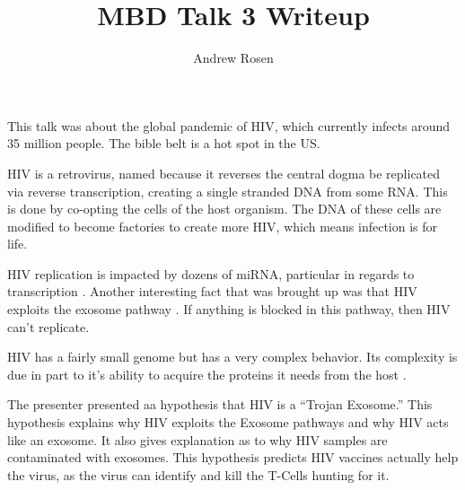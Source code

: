 \documentclass[10pt,letterpaper]{article}
\author{Andrew Rosen}
\title{MBD Talk 3 Writeup}
\begin{document}
	\maketitle
	This talk was about the global pandemic of HIV, which currently infects around 35 million people.
	The bible belt is a hot spot in the US.
	
	HIV is a retrovirus, named because it reverses the central dogma be replicated via reverse transcription, creating a single stranded DNA from some RNA.
	This is done by co-opting the cells of the host organism.
	The DNA of these cells are modified to become factories to create more HIV, which means infection is for life.
	
	HIV replication is impacted by dozens of miRNA, particular in regards to transcription \cite{klase2012micrornas}.
	Another interesting fact that was brought up  was that HIV exploits the exosome pathway \cite{nguyen2003evidence}.  
	If anything is blocked in this pathway, then HIV can't replicate.
	
	
	HIV has a fairly small genome but has a very complex behavior.
	Its complexity is due in part to it's ability to acquire the proteins it needs from the host \cite{guo1995hiv}.
	
	
	The presenter presented aa hypothesis that HIV is a ``Trojan Exosome.''
	This hypothesis explains why HIV exploits the Exosome pathways and why HIV acts like an exosome.
	It also gives explanation as to why HIV samples are contaminated with exosomes.
	This hypothesis predicts HIV vaccines actually help the virus, as the virus can identify and kill the T-Cells hunting for it.
	
	
	
	
	
		
		
		
	
	
\end{document}
